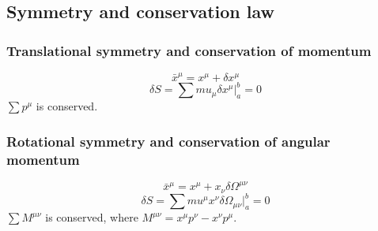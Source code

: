 \documentclass{article}
\begin{document}
\subsection{Symmetry and conservation law}
\subsubsection{Translational symmetry and conservation of momentum}
\[\bar{x}^{\mu} = x^{\mu} + \delta x^{\mu}\]
\[\delta S = \sum mu_{\mu} \delta x^{\mu}|_a^b = 0 \]
$\sum p^{\mu}$ is conserved.
\subsubsection{Rotational symmetry and conservation of angular momentum}
\[\bar{x}^{\mu} = x^{\mu} + x_{\nu}\delta \Omega^{\mu \nu}\]
\[\delta S = \sum mu^{\mu} x^{\nu} \delta \Omega_{\mu \nu}|_a^b = 0 \]
$\sum M^{\mu \nu} $ is conserved, where $M^{\mu \nu} = x^{\mu}p^{\nu} - x^{\nu}p^{\mu}$.
\end{document}
